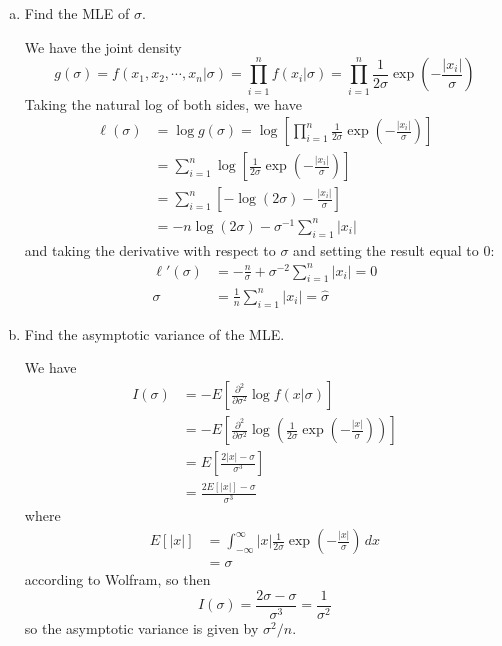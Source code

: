 \documentclass{article}
\begin{document}
\begin{itemize}
\begin{enumerate}[(a)]
\begin{soln}
				\end{soln}

				\newpage
			\item Find the MLE of $\sigma.$
				\begin{soln}
					We have the joint density \[g(\sigma)=f(x_1, x_2, \cdots, x_n | \sigma) = \prod_{i=1}^n f(x_i|\sigma) = \prod_{i=1}^n \frac{1}{2\sigma}\exp{\left(-\frac{|x_i|}{\sigma}\right)}\] Taking the natural log of both sides, we have
					\begin{align*}
						\ell(\sigma) &=\log g(\sigma) = \log\left[ \prod_{i=1}^n \frac{1}{2\sigma}\exp{\left( -\frac{|x_i|}{\sigma} \right)} \right] \\ 
						&= \sum_{i=1}^{n} \log\left[ \frac{1}{2\sigma}\exp{\left( -\frac{|x_i|}{\sigma} \right)} \right] \\
						&= \sum_{i=1}^{n} \left[ -\log(2\sigma) - \frac{|x_i|}{\sigma} \right] \\
						&= -n\log(2\sigma)-\sigma^{-1}\sum_{i=1}^{n}|x_i|
					\end{align*} and taking the derivative with respect to $\sigma$ and setting the result equal to 0:
					\begin{align*}
						\ell'(\sigma) &= -\frac{n}{\sigma} + \sigma^{-2}\sum_{i=1}^{n}|x_i| = 0 \\
						\sigma &= \frac{1}{n}\sum_{i=1}^{n}|x_i| = \hat{\sigma}
					\end{align*}
				\end{soln}

			\item Find the asymptotic variance of the MLE.
				\begin{soln}
					We have 
					\begin{align*}
						I(\sigma) &= -E\left[ \frac{\partial^2}{\partial \sigma^2}\log f(x|\sigma) \right] \\
						&= -E\left[ \frac{\partial^2}{\partial \sigma^2} \log \left( \frac{1}{2\sigma} \exp{\left( -\frac{|x|}{\sigma} \right)} \right) \right] \\
						&= E\left[ \frac{2|x|-\sigma}{\sigma^3} \right] \\
						&= \frac{2E[|x|]-\sigma}{\sigma^3}
					\end{align*} where 
					\begin{align*}
						E[|x|] &= \int_{-\infty}^\infty |x| \frac{1}{2\sigma} \exp{\left( -\frac{|x|}{\sigma} \right)}\, dx \\
						&= \sigma
					\end{align*} according to Wolfram, so then \[I(\sigma)=\frac{2\sigma-\sigma}{\sigma^3} = \frac{1}{\sigma^2}\] so the asymptotic variance is given by $\boxed{\sigma^2/n.}$

				\end{soln}
				
		\end{enumerate}
\end{itemize}
\end{document}
